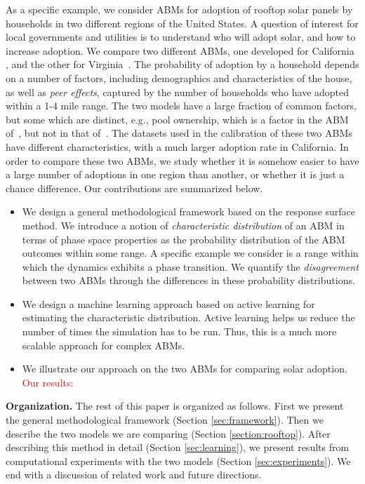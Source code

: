 As a specific example, we consider ABMs for 
 adoption of rooftop solar panels by households in two different regions of the United States.
A question of interest for local governments and utilities is to
understand who will adopt solar, and how to increase adoption.
We compare two different ABMs, one developed for California \cite{zhang16solar},
and the other for Virginia~\cite{hu19rooftop}. The probability of adoption by a household depends on a number of factors,
including demographics and characteristics of the house, as well as \emph{peer effects}, captured by the number of
households who have adopted within a 1-4 mile range. The two models have a large fraction of common factors,
but some which are distinct, e.g., pool ownership, which is a factor in the ABM of~\cite{zhang16solar},
but not in that of~\cite{hu19rooftop}. The datasets used in the calibration of these two ABMs have different
characteristics, with a much larger adoption rate in California.
In order to compare these two ABMs, we study whether it is somehow easier to have a large number of adoptions 
in one region than another, or whether it is just a chance difference. 
Our contributions are summarized below.
\begin{itemize}
\item
We design a general methodological framework based on the response surface method. We introduce a notion of
\emph{characteristic distribution} of an ABM in terms of phase space properties as the probability distribution of the ABM outcomes within some range. A specific example we consider is a range within which the dynamics exhibits a phase transition. We quantify the \emph{disagreement} between two ABMs through the differences in these probability distributions.
\item 
We design a machine learning approach based on active learning for estimating the characteristic distribution.
Active learning helps us reduce the number of times the simulation has to be run.
Thus, this is a much
more scalable approach for complex ABMs.
\item
We illustrate our approach on the two ABMs for comparing solar adoption.
\textcolor{red}{Our results:}
\end{itemize}

\noindent
\textbf{Organization.}
The rest of this paper is organized as follows. First we present the general methodological framework
(Section \ref{sec:framework}).
Then we describe the two models we are comparing (Section \ref{section:rooftop}).
After describing this method in detail (Section \ref{sec:learning}), we present results from computational experiments with the two models (Section \ref{sec:experiments}). We end with a discussion of related work and future directions.
